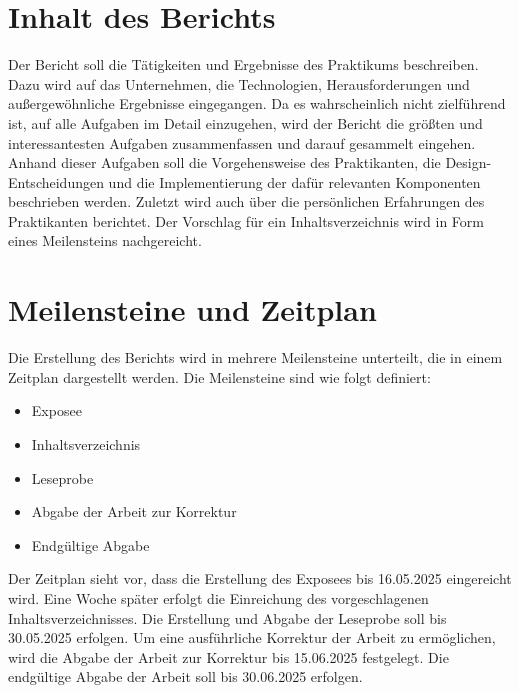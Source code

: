 \section{Inhalt des Berichts} \label{sec:inhalt}

Der Bericht soll die Tätigkeiten und Ergebnisse des Praktikums beschreiben. Dazu wird auf das Unternehmen, die Technologien, Herausforderungen und außergewöhnliche 
Ergebnisse eingegangen. Da es wahrscheinlich nicht zielführend ist, auf alle Aufgaben im Detail einzugehen, wird der Bericht die größten und interessantesten Aufgaben
zusammenfassen und darauf gesammelt eingehen. Anhand dieser Aufgaben soll die Vorgehensweise des Praktikanten, die Design-Entscheidungen und die Implementierung der dafür 
relevanten Komponenten beschrieben werden. Zuletzt wird auch über die persönlichen Erfahrungen des Praktikanten berichtet.
Der Vorschlag für ein Inhaltsverzeichnis wird in Form eines Meilensteins nachgereicht.

\section{Meilensteine und Zeitplan} \label{sec:meilensteine}

Die Erstellung des Berichts wird in mehrere Meilensteine unterteilt, die in einem Zeitplan
dargestellt werden. Die Meilensteine sind wie folgt definiert:

\begin{itemize}
	\item Exposee
	\item Inhaltsverzeichnis
	\item Leseprobe
	\item Abgabe der Arbeit zur Korrektur
	\item Endgültige Abgabe
\end{itemize}

Der Zeitplan sieht vor, dass die Erstellung des Exposees bis 16.05.2025 eingereicht wird. Eine Woche später erfolgt die Einreichung des vorgeschlagenen Inhaltsverzeichnisses.
Die Erstellung und Abgabe der Leseprobe soll bis 30.05.2025 erfolgen.
Um eine ausführliche Korrektur der Arbeit zu ermöglichen, wird die Abgabe der Arbeit zur Korrektur bis 15.06.2025 festgelegt.
Die endgültige Abgabe der Arbeit soll bis 30.06.2025 erfolgen.

